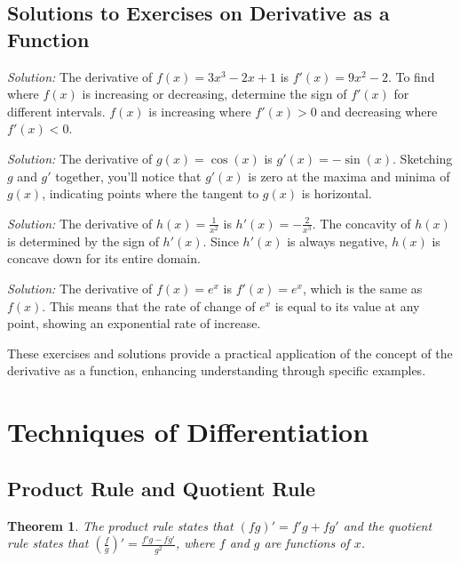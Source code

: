 \documentclass[a4paper,12pt]{book}
\newenvironment{solution}[1][]
{\par\noindent\textit{Solution:} \rmfamily}{\medskip}
\newcounter{example}
\newtheorem{theorem}{Theorem}
\begin{document}
\subsection{Solutions to Exercises on Derivative as a Function}

\begin{solution}[to Exercise 1]
The derivative of \( f(x) = 3x^3 - 2x + 1 \) is \( f'(x) = 9x^2 - 2 \). 
To find where \( f(x) \) is increasing or decreasing, determine the sign of \( f'(x) \) for different intervals. \( f(x) \) is increasing where \( f'(x) > 0 \) and decreasing where \( f'(x) < 0 \).
\end{solution}

\begin{solution}[to Exercise 2]
The derivative of \( g(x) = \cos(x) \) is \( g'(x) = -\sin(x) \). Sketching \( g \) and \( g' \) together, you'll notice that \( g'(x) \) is zero at the maxima and minima of \( g(x) \), indicating points where the tangent to \( g(x) \) is horizontal.
\end{solution}

\begin{solution}[to Exercise 3]
The derivative of \( h(x) = \frac{1}{x^2} \) is \( h'(x) = -\frac{2}{x^3} \). The concavity of \( h(x) \) is determined by the sign of \( h'(x) \). Since \( h'(x) \) is always negative, \( h(x) \) is concave down for its entire domain.
\end{solution}

\begin{solution}[to Exercise 4]
The derivative of \( f(x) = e^x \) is \( f'(x) = e^x \), which is the same as \( f(x) \). This means that the rate of change of \( e^x \) is equal to its value at any point, showing an exponential rate of increase.
\end{solution}

These exercises and solutions provide a practical application of the concept of the derivative as a function, enhancing understanding through specific examples.


\section{Techniques of Differentiation}
\subsection{Product Rule and Quotient Rule}
\begin{theorem}
The product rule states that \( (fg)' = f'g + fg' \) and the quotient rule states that \( \left(\frac{f}{g}\right)' = \frac{f'g - fg'}{g^2} \), where \( f \) and \( g \) are functions of \( x \).
\end{theorem}
\end{document}
